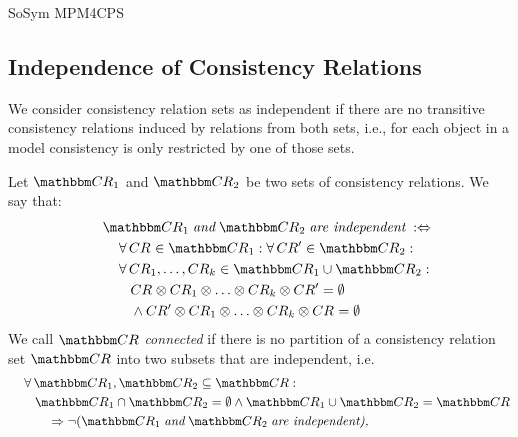 \begin{copiedFrom}{SoSym MPM4CPS}
\subsection{Independence of Consistency Relations}

We consider consistency relation sets as independent if there are no transitive consistency relations induced by relations from both sets, i.e., for each object in a model consistency is only restricted by one of those sets.

\begin{definition}
    \label{def:independence}
    Let $\consistencyrelationset{CR}_{1}$ and $\consistencyrelationset{CR}_{2}$ be two sets of consistency relations. We say that:
    \begin{align*}
        \formulaskip &
        \consistencyrelationset{CR}_{1} \mathtext{and} \consistencyrelationset{CR}_{2} \mathtext{are independent} \equivalentperdefinition \\
        & \formulaskip
        \forall \consistencyrelation{CR}{} \in \consistencyrelationset{CR}_{1} : \forall \consistencyrelation{CR'}{} \in \consistencyrelationset{CR}_{2} : \\
        & \formulaskip 
        \forall \consistencyrelation{CR}{1}, \dots, \consistencyrelation{CR}{k} \in \consistencyrelationset{CR}_{1} \cup \consistencyrelationset{CR}_{2} : \\
        & \formulaskip\formulaskip
        \consistencyrelation{CR}{} \concat \consistencyrelation{CR}{1} \concat \dots \concat \consistencyrelation{CR}{k} \concat \consistencyrelation{CR'}{} = \emptyset \\
        & \formulaskip\formulaskip
        \land \consistencyrelation{CR'}{} \concat \consistencyrelation{CR}{1} \concat \dots \concat \consistencyrelation{CR}{k} \concat \consistencyrelation{CR}{} = \emptyset
    \end{align*}
    We call $\consistencyrelationset{CR}$ \emph{connected} if there is no partition of a consistency relation set $\consistencyrelationset{CR}$ into two subsets that are independent, i.e.
    \begin{align*}
        \formulaskip &
        \forall \consistencyrelationset{CR}_{1}, \consistencyrelationset{CR}_{2} \subseteq \consistencyrelationset{CR} : \\
        & \formulaskip 
        \consistencyrelationset{CR}_{1} \cap \consistencyrelationset{CR}_{2} = \emptyset \land \consistencyrelationset{CR}_{1} \cup \consistencyrelationset{CR}_{2} = \consistencyrelationset{CR}  \\
        & \formulaskip\formulaskip
        \Rightarrow \neg (\consistencyrelationset{CR}_{1} \mathtext{and} \consistencyrelationset{CR}_{2} \mathtext{are independent),}
    \end{align*}
\end{definition}


\end{copiedFrom}
